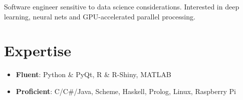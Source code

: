 \documentclass[11pt,a4paper,sans]{moderncv}        %
\begin{document}
\makecvtitle
\vspace*{-5mm}
\small{Software engineer sensitive to data science considerations. Interested in deep learning, neural nets and GPU-accelerated parallel processing.}

\section{Expertise}
  \begin{itemize}
   \item{
     \textbf{Fluent}{: Python \& PyQt, R \& R-Shiny, MATLAB}
      }
   \item{
     \textbf{Proficient}{: C/C\#/Java, Scheme, Haskell, Prolog, Linux, Raspberry Pi}
   }
 \end{itemize}

 

\end{document}
